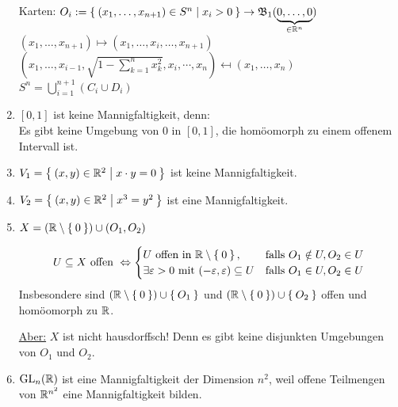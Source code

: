 \begin{beispiel}
\begin{enumerate}[label=\arabic*)]
              Karten: $O_i := \Set{(x_1, \dots, x_{n+1}) \in S^n | x_i > 0} \rightarrow \mathfrak{B}_1 (\underbrace{0, \dots, 0}_{\in \mathbb{R}^n})$\\
              $(x_1, \dots, x_{n+1}) \mapsto (x_1, \dots, x_i, \dots, x_{n+1})$\\
              $(x_1, \dots, x_{i-1}, \sqrt{1-\sum_{k=1}^n x_k^2}, x_i, \cdots, x_n)\mapsfrom (x_1, \dots, x_n)$\\
              $S^n = \bigcup_{i=1}^{n+1} (C_i \cup D_i)$
        \item $[0,1]$ ist keine Mannigfaltigkeit, denn:\\
              Es gibt keine Umgebung von $0$ in $[0,1]$, die homöomorph
              zu einem offenem Intervall ist.
        \item $V_1 = \Set{(x,y) \in \ensuremath{\mathbb{R}}^2 | x \cdot y = 0}$ ist
              keine Mannigfaltigkeit. 
        \item $V_2 = \Set{(x,y) \in \ensuremath{\mathbb{R}}^2 | x^3 = y^2}$ ist eine
              Mannigfaltigkeit.
        \item $X = (\mathbb{R} \setminus \Set{0}) \cup (O_1, O_2)$

              \[U \subseteq X \text{ offen } \Leftrightarrow 
                \begin{cases}
                    U \text{ offen in } \mathbb{R} \setminus \Set{0}, &\text{falls } O_1 \notin U, O_2 \in U\\
                    \exists \varepsilon > 0 \text{ mit } (-\varepsilon, \varepsilon) \subseteq U &\text{falls } O_1 \in U, O_2 \in U
                \end{cases}\]
              Insbesondere sind $(\mathbb{R} \setminus \Set{0}) \cup \Set{O_1}$
              und $(\mathbb{R} \setminus \Set{0}) \cup \Set{O_2}$ offen und
              homöomorph zu $\mathbb{R}$.

              \underline{Aber:} $X$ ist nicht hausdorffsch!
              Denn es gibt keine disjunkten Umgebungen von $O_1$ und
              $O_2$.
        \item $\mathrm{GL}_n(\mathbb{R})$ ist eine Mannigfaltigkeit der Dimension 
              $n^2$, weil offene Teilmengen von $\mathbb{R}^{n^2}$ eine
              Mannigfaltigkeit bilden.
    \end{enumerate}
\end{beispiel}

